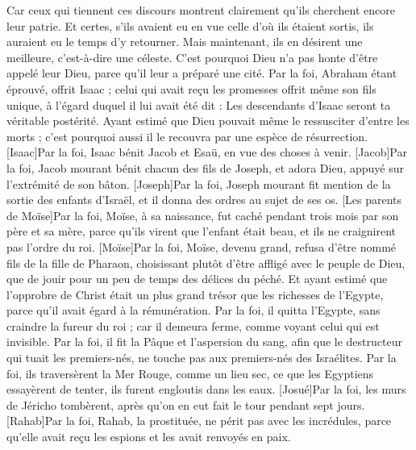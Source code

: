 \begin{multicols}{2}
Car ceux qui tiennent ces discours montrent clairement qu'ils cherchent encore leur patrie.
Et certes, s'ils avaient eu en vue celle d'où ils étaient sortis, ils auraient eu le temps d'y retourner.
Mais maintenant, ils en désirent une meilleure, c'est-à-dire une céleste. C'est pourquoi Dieu n'a pas honte d'être appelé leur Dieu, parce qu'il leur a préparé une cité.
Par la foi, Abraham étant éprouvé, offrit Isaac ; celui qui avait reçu les promesses offrit même son fils unique,
à l'égard duquel il lui avait été dit : Les descendants d'Isaac seront ta véritable postérité.
Ayant estimé que Dieu pouvait même le ressusciter d'entre les morts ; c'est pourquoi aussi il le recouvra par une espèce de résurrection.
[Isaac]Par la foi, Isaac bénit Jacob et Esaü, en vue des choses à venir.
[Jacob]Par la foi, Jacob mourant bénit chacun des fils de Joseph, et adora Dieu, appuyé sur l'extrémité de son bâton.
[Joseph]Par la foi, Joseph mourant fit mention de la sortie des enfants d'Israël, et il donna des ordres au sujet de ses os.
[Les parents de Moïse]Par la foi, Moïse, à sa naissance, fut caché pendant trois mois par son père et sa mère, parce qu'ils virent que l'enfant était beau, et ils ne craignirent pas l'ordre du roi.
[Moïse]Par la foi, Moïse, devenu grand, refusa d'être nommé fils de la fille de Pharaon,
choisissant plutôt d'être affligé avec le peuple de Dieu, que de jouir pour un peu de temps des délices du péché.
Et ayant estimé que l'opprobre de Christ était un plus grand trésor que les richesses de l'Egypte, parce qu'il avait égard à la rémunération.
Par la foi, il quitta l'Egypte, sans craindre la fureur du roi ; car il demeura ferme, comme voyant celui qui est invisible.
Par la foi, il fit la Pâque et l'aspersion du sang, afin que le destructeur qui tuait les premiers-nés, ne touche pas aux premiers-nés des Israélites.
Par la foi, ils traversèrent la Mer Rouge, comme un lieu sec, ce que les Egyptiens essayèrent de tenter, ils furent engloutis dans les eaux.
[Josué]Par la foi, les murs de Jéricho tombèrent, après qu'on en eut fait le tour pendant sept jours.
[Rahab]Par la foi, Rahab, la prostituée, ne périt pas avec les incrédules, parce qu'elle avait reçu les espions et les avait renvoyés en paix.

\end{multicols}
